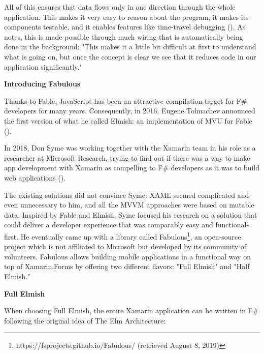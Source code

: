 All of this ensures that data flows only in one direction through the whole application. This makes it very easy to reason about the program, it makes its components testable, and it enables features like time-travel debugging (\cite{james_time_2014}). As \cite[121]{loder_web_2018} notes, this is made possible through much wiring that is automatically being done in the background: "This makes it a little bit difficult at first to understand what is going on, but once the concept is clear we see that it reduces code in our application significantly."

\textbf{Introducing Fabulous}

Thanks to Fable, JavaScript has been an attractive compilation target for F\# developers for many years. Consequently, in 2016, Eugene Tolmachev announced the first version of what he called Elmish: an implementation of MVU for Fable (\cite{tolmachev_cross-platform_2016}).

In 2018, Don Syme was working together with the Xamarin team in his role as a researcher at Microsoft Research, trying to find out if there was a way to make app development with Xamarin as compelling to F\# developers as it was to build web applications (\cite{syme_making_2018}).

The existing solutions did not convince Syme: XAML seemed complicated and even unnecessary to him, and all the MVVM approaches were based on mutable data. Inspired by Fable and Elmish, Syme focused his research on a solution that could deliver a developer experience that was comparably easy and functional-first. He eventually came up with a library called Fabulous\footnote{https://fsprojects.github.io/Fabulous/ (retrieved August 8, 2019)}, an open-source project which is not affiliated to Microsoft but developed by its community of volunteers. Fabulous allows building mobile applications in a functional way on top of Xamarin.Forms by offering two different flavors: "Full Elmish" and "Half Elmish."

\textbf{Full Elmish}

When choosing Full Elmish, the entire Xamarin application can be written in F\# following the original idea of The Elm Architecture:

